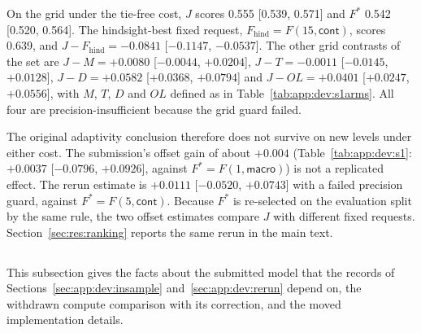 \begin{revblock}
On the grid under the tie-free cost, $J$ scores 0.555 [0.539, 0.571] and $F^{*}$ 0.542 [0.520, 0.564]. The hindsight-best fixed request, $F_{\mathrm{hind}}=F(15,\textsf{cont})$, scores 0.639, and $J-F_{\mathrm{hind}}=-0.0841$ [$-0.1147$, $-0.0537$]. The other grid contrasts of the set are $J-M=+0.0080$ [$-0.0044$, $+0.0204$], $J-T=-0.0011$ [$-0.0145$, $+0.0128$], $J-D=+0.0582$ [$+0.0368$, $+0.0794$] and $J-OL=+0.0401$ [$+0.0247$, $+0.0556$], with $M$, $T$, $D$ and $OL$ defined as in Table~\ref{tab:app:dev:s1arms}. All four are precision-insufficient because the grid guard failed.

The original adaptivity conclusion therefore does not survive on new levels under either cost. The submission's offset gain of about $+0.004$ (Table~\ref{tab:app:dev:s1}: $+0.0037$ [$-0.0796$, $+0.0926$], against $F^{*}=F(1,\textsf{macro})$) is not a replicated effect. The rerun estimate is $+0.0111$ [$-0.0520$, $+0.0743$] with a failed precision guard, against $F^{*}=F(5,\textsf{cont})$. Because $F^{*}$ is re-selected on the evaluation split by the same rule, the two offset estimates compare $J$ with different fixed requests. Section~\ref{sec:res:ranking} reports the same rerun in the main text.
\end{revblock}

\subsection{\texorpdfstring{}{Submitted Model Facts, Withdrawn Compute Record and Implementation}}
\label{sec:app:dev:model}

\begin{revblock}
This subsection gives the facts about the submitted model that the records of Sections~\ref{sec:app:dev:insample} and~\ref{sec:app:dev:rerun} depend on, the withdrawn compute comparison with its correction, and the moved implementation details.
\end{revblock}

\subsubsection{\texorpdfstring{}{Submitted Model Facts}}
\label{sec:app:dev:facts}


